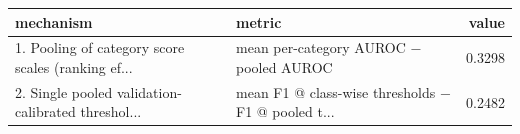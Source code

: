 \begin{tabular}{llr}
\toprule
                                         mechanism &                                             metric &  value \\
\midrule
1. Pooling of category score scales (ranking ef... &             mean per-category AUROC − pooled AUROC & 0.3298 \\
2. Single pooled validation-calibrated threshol... & mean F1 @ class-wise thresholds − F1 @ pooled t... & 0.2482 \\
\bottomrule
\end{tabular}
